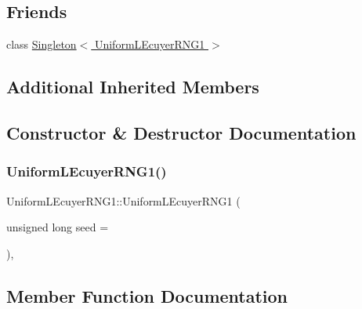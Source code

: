 \subsection*{Friends}
\begin{DoxyCompactItemize}
\item 
class \hyperlink{class_uniform_l_ecuyer_r_n_g1_a2172e86797a63307beeb012b51fe6521}{Singleton$<$ Uniform\+L\+Ecuyer\+R\+N\+G1 $>$}
\end{DoxyCompactItemize}
\subsection*{Additional Inherited Members}


\subsection{Constructor \& Destructor Documentation}
\hypertarget{class_uniform_l_ecuyer_r_n_g1_a337fc3fe276e950c8ef9e330779eedb7}{}\label{class_uniform_l_ecuyer_r_n_g1_a337fc3fe276e950c8ef9e330779eedb7} 
\subsubsection{\texorpdfstring{Uniform\+L\+Ecuyer\+R\+N\+G1()}{UniformLEcuyerRNG1()}}
{\footnotesize\ttfamily Uniform\+L\+Ecuyer\+R\+N\+G1\+::\+Uniform\+L\+Ecuyer\+R\+N\+G1 (\begin{DoxyParamCaption}\item[{unsigned long}]{seed = {} }\end{DoxyParamCaption})\hspace{0.3cm}{\ttfamily [explicit]}, {\ttfamily [private]}}



\subsection{Member Function Documentation}
\hypertarget{class_uniform_l_ecuyer_r_n_g1_aaed8bab7d34f76064ca34b1d35b204f4}{}\label{class_uniform_l_ecuyer_r_n_g1_aaed8bab7d34f76064ca34b1d35b204f4} 
